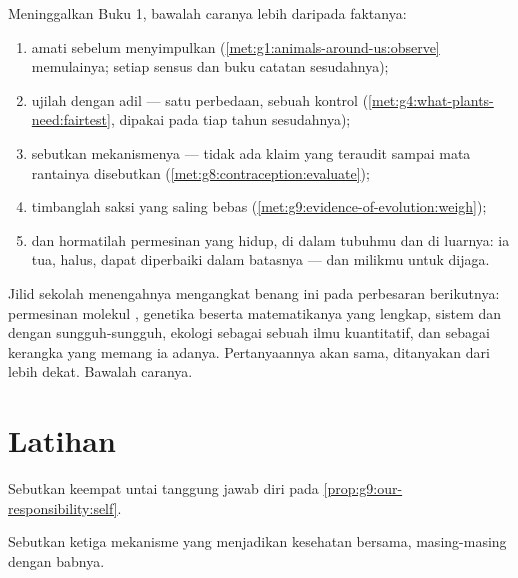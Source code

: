 \begin{method}\label{met:g9:our-responsibility:method}
Meninggalkan Buku 1, bawalah caranya lebih daripada faktanya:
\begin{enumerate}
  \item amati sebelum menyimpulkan
        (\cref{met:g1:animals-around-us:observe}
        memulainya; setiap sensus dan buku catatan sesudahnya);
  \item ujilah dengan adil --- satu perbedaan, sebuah kontrol
        (\cref{met:g4:what-plants-need:fairtest}, dipakai
        pada tiap tahun sesudahnya);
  \item sebutkan mekanismenya --- tidak ada klaim yang
        teraudit sampai mata rantainya disebutkan
        (\cref{met:g8:contraception:evaluate});
  \item timbanglah saksi yang saling bebas
        (\cref{met:g9:evidence-of-evolution:weigh});
  \item dan hormatilah permesinan yang hidup, di dalam
        tubuhmu dan di luarnya: ia tua, halus, dapat
        diperbaiki dalam batasnya --- dan milikmu untuk dijaga.
\end{enumerate}
\end{method}

\begin{remark}\label{rem:g9:our-responsibility:next}
Jilid sekolah menengahnya mengangkat benang ini pada
perbesaran berikutnya: permesinan molekul , genetika
beserta matematikanya yang lengkap, sistem  dan
 dengan sungguh-sungguh, ekologi sebagai sebuah ilmu
kuantitatif, dan  sebagai kerangka yang memang ia
adanya. Pertanyaannya akan sama, ditanyakan dari lebih
dekat. Bawalah caranya.
\end{remark}

\section{Latihan}

\begin{exercise}[$\star$]\label{exo:g9:our-responsibility:1}
Sebutkan keempat untai tanggung jawab diri pada
\cref{prop:g9:our-responsibility:self}.
\end{exercise}

\begin{exercise}[$\star$]\label{exo:g9:our-responsibility:2}
Sebutkan ketiga mekanisme yang menjadikan kesehatan
bersama, masing-masing dengan babnya.
\end{exercise}

